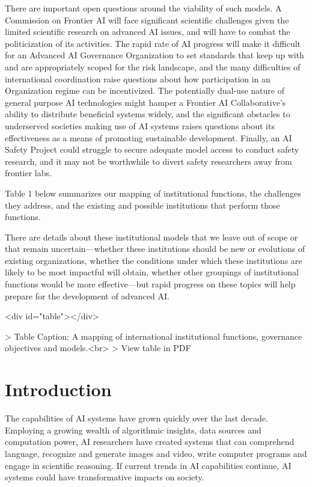 \documentclass[12pt]{article}
\begin{document}
There are important open questions around the viability of such models.
A Commission on Frontier AI will face significant scientific challenges
given the limited scientific research on advanced AI issues, and will
have to combat the politicization of its activities. The rapid rate of
AI progress will make it difficult for an Advanced AI Governance
Organization to set standards that keep up with and are appropriately
scoped for the risk landscape, and the many difficulties of
international coordination raise questions about how participation in an
Organization regime can be incentivized. The potentially dual-use nature
of general purpose AI technologies might hamper a Frontier AI
Collaborative's ability to distribute beneficial systems widely, and the
significant obstacles to underserved societies making use of AI systems
raises questions about its effectiveness as a means of promoting
sustainable development. Finally, an AI Safety Project could struggle to
secure adequate model access to conduct safety research, and it may not
be worthwhile to divert safety researchers away from frontier labs.

Table 1 below summarizes our mapping of institutional functions, the
challenges they address, and the existing and possible institutions that
perform those functions.

There are details about these institutional models that we leave out of
scope or that remain uncertain---whether these institutions should be
new or evolutions of existing organizations, whether the conditions
under which these institutions are likely to be most impactful will
obtain, whether other groupings of institutional functions would be more
effective---but rapid progress on these topics will help prepare for the
development of advanced AI.

\begin{table}<div id="table"></div>

> Table Caption: \label{table}A mapping of international institutional functions, governance objectives and models.<br>
> View table in PDF
\end{table}


\pagebreak 

\section{Introduction}
The capabilities of AI systems have grown quickly over the last decade.
Employing a growing wealth of algorithmic insights, data sources and
computation power, AI researchers have created systems that can
comprehend language, recognize and generate images and video, write
computer programs and engage in scientific reasoning. If current trends
in AI capabilities continue, AI systems could have transformative
impacts on society.
\end{document}
